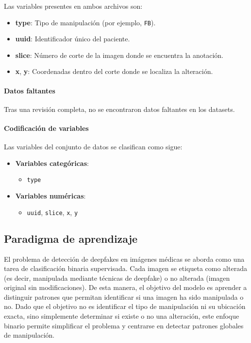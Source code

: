 \documentclass[conference]{IEEEtran}
\begin{document}
Las variables presentes en ambos archivos son:

\begin{itemize}
    \item \textbf{type}: Tipo de manipulación (por ejemplo, \texttt{FB}).
    \item \textbf{uuid}: Identificador único del paciente.
    \item \textbf{slice}: Número de corte de la imagen donde se encuentra la anotación.
    \item \textbf{x}, \textbf{y}: Coordenadas dentro del corte donde se localiza la alteración.
\end{itemize}


\paragraph{Datos faltantes}
Tras una revisión completa, no se encontraron datos faltantes en los datasets. 

\paragraph{Codificación de variables}

Las variables del conjunto de datos se clasifican como sigue:

\begin{itemize}
    \item \textbf{Variables categóricas}:
        \begin{itemize}
            \item \texttt{type}
        \end{itemize}
    \item \textbf{Variables numéricas}:
        \begin{itemize}
            \item \texttt{uuid}, \texttt{slice}, \texttt{x}, \texttt{y}
        \end{itemize}
\end{itemize}

\subsection{Paradigma de aprendizaje}

El problema de detección de deepfakes en imágenes médicas se aborda como una tarea de clasificación binaria supervisada. Cada imagen se etiqueta como alterada (es decir, manipulada mediante técnicas de deepfake) o no alterada (imagen original sin modificaciones). De esta manera, el objetivo del modelo es aprender a distinguir patrones que permitan identificar si una imagen ha sido manipulada o no.
Dado que el objetivo no es identificar el tipo de manipulación ni su ubicación exacta, sino simplemente determinar si existe o no una alteración, este enfoque binario permite simplificar el problema y centrarse en detectar patrones globales de manipulación.
\end{document}
